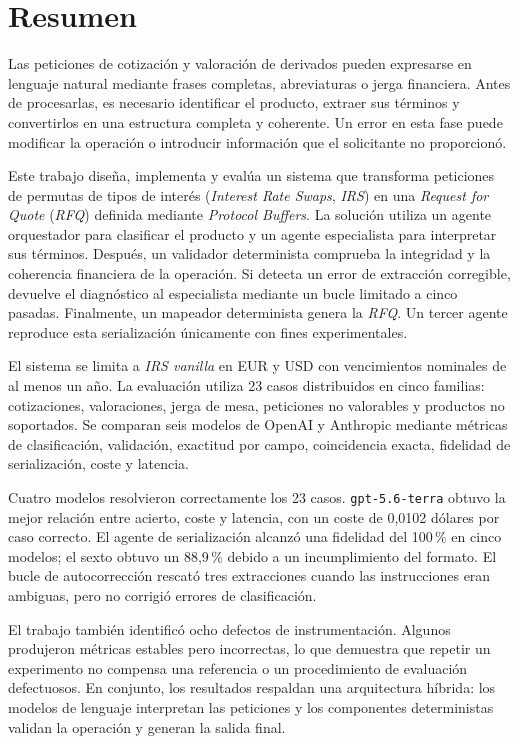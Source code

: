 \chapter*{Resumen}

Las peticiones de cotización y valoración de derivados pueden expresarse en lenguaje natural mediante frases completas, abreviaturas o jerga financiera. Antes de procesarlas, es necesario identificar el producto, extraer sus términos y convertirlos en una estructura completa y coherente. Un error en esta fase puede modificar la operación o introducir información que el solicitante no proporcionó.

Este trabajo diseña, implementa y evalúa un sistema que transforma peticiones de permutas de tipos de interés (\textit{Interest Rate Swaps}, \textit{IRS}) en una \textit{Request for Quote} (\textit{RFQ}) definida mediante \textit{Protocol Buffers}. La solución utiliza un agente orquestador para clasificar el producto y un agente especialista para interpretar sus términos. Después, un validador determinista comprueba la integridad y la coherencia financiera de la operación. Si detecta un error de extracción corregible, devuelve el diagnóstico al especialista mediante un bucle limitado a cinco pasadas. Finalmente, un mapeador determinista genera la \textit{RFQ}. Un tercer agente reproduce esta serialización únicamente con fines experimentales.

El sistema se limita a \textit{IRS vanilla} en EUR y USD con vencimientos nominales de al menos un año. La evaluación utiliza 23 casos distribuidos en cinco familias: cotizaciones, valoraciones, jerga de mesa, peticiones no valorables y productos no soportados. Se comparan seis modelos de OpenAI y Anthropic mediante métricas de clasificación, validación, exactitud por campo, coincidencia exacta, fidelidad de serialización, coste y latencia.

Cuatro modelos resolvieron correctamente los 23 casos. \texttt{gpt-5.6-terra} obtuvo la mejor relación entre acierto, coste y latencia, con un coste de 0,0102 dólares por caso correcto. El agente de serialización alcanzó una fidelidad del 100\,\% en cinco modelos; el sexto obtuvo un 88,9\,\% debido a un incumplimiento del formato. El bucle de autocorrección rescató tres extracciones cuando las instrucciones eran ambiguas, pero no corrigió errores de clasificación.

El trabajo también identificó ocho defectos de instrumentación. Algunos produjeron métricas estables pero incorrectas, lo que demuestra que repetir un experimento no compensa una referencia o un procedimiento de evaluación defectuosos. En conjunto, los resultados respaldan una arquitectura híbrida: los modelos de lenguaje interpretan las peticiones y los componentes deterministas validan la operación y generan la salida final.


